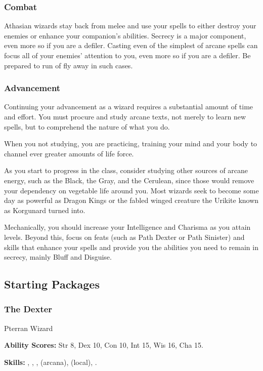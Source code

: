 \subsubsection{Combat}
Athasian wizards stay back from melee and use your spells to either destroy your enemies or enhance your companion's abilities. Secrecy is a major component, even more so if you are a defiler. Casting even of the simplest of arcane spells can focus all of your enemies' attention to you, even more so if you are a defiler. Be prepared to run of fly away in such cases.

\subsubsection{Advancement}
Continuing your advancement as a wizard requires a substantial amount of time and effort. You must procure and study arcane texts, not merely to learn new spells, but to comprehend the nature of what you do.

When you not studying, you are practicing, training your mind and your body to channel ever greater amounts of life force.

As you start to progress in the class, consider studying other sources of arcane energy, such as the Black, the Gray, and the Cerulean, since those would remove your dependency on vegetable life around you. Most wizards seek to become some day as powerful as Dragon Kings or the fabled winged creature the Urikite known as Korgunard turned into.

Mechanically, you should increase your Intelligence and Charisma as you attain levels. Beyond this, focus on feats (such as Path Dexter or Path Sinister) and skills that enhance your spells and provide you the abilities you need to remain in secrecy, mainly Bluff and Disguise.


\subsection{Starting Packages}
\subsubsection{The Dexter}
Pterran Wizard

\textbf{Ability Scores:} Str 8, Dex 10, Con 10, Int 15, Wis 16, Cha 15.

\textbf{Skills:} , , ,  (arcana),  (local), .

